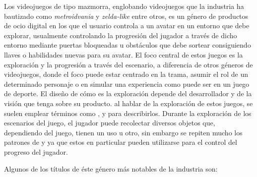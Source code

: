 Los videojuegos de tipo mazmorra, englobando videojuegos que la industria ha bautizado como \textit{metroidvania} y \textit{zelda-like} entre otros, es un género de productos de ocio digital en los que el usuario controla a un avatar en un entorno que debe explorar, usualmente controlando la progresión del jugador a través de dicho entorno mediante puertas bloqueadas u obstáculos que debe sortear consiguiendo llaves o habilidades nuevas para su avatar.
El foco central de estos juegos es la exploración y la progresión a través del escenario, a diferencia de otros géneros de videojuegos, donde el foco puede estar centrado en la trama, asumir el rol de un determinado personaje o en simular una experiencia como puede ser en un juego de deporte. El diseño de cómo es la exploración depende del desarrollador y de la visión que tenga sobre su producto.
al hablar de la exploración de estos juegos, se suelen emplear términos como ,  y  para describirlos. Durante la exploración de los escenarios del juego, el jugador puede recolectar diversos objetos que, dependiendo del juego, tienen un uso u otro, sin embargo se repiten mucho los patrones de  y  ya que estos en particular pueden utilizarse para el control del progreso del jugador.

Algunos de los títulos de éste género más notables de la industria son: